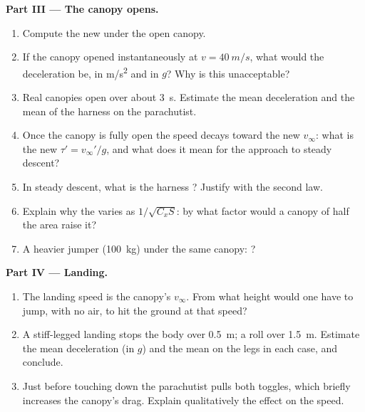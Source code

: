 \begin{problem}
\medskip
\noindent\textbf{Part III --- The canopy opens.}
\begin{enumerate}[resume]
  \item Compute the new  under the open canopy.
  \item If the canopy opened instantaneously at $v = \qty{40}{m/s}$, what
        would the deceleration be, in \unit{m/s^2} and in $g$? Why is
        this unacceptable?
  \item Real canopies open over about \qty{3}{s}. Estimate the mean
        deceleration and the mean  of the harness on the
        parachutist.
  \item Once the canopy is fully open the speed decays toward the new
        $v_\infty$: what is the new  $\tau' = v_\infty'/g$,
        and what does it mean for the approach to steady descent?
  \item In steady descent, what is the harness ? Justify with the
        second law.
  \item Explain why the  varies as $1/\sqrt{C_xS}$: by
        what factor would a canopy of half the area raise it?
  \item A heavier jumper (\qty{100}{kg}) under the same canopy: ?
\end{enumerate}

\medskip
\noindent\textbf{Part IV --- Landing.}
\begin{enumerate}[resume]
  \item The landing speed is the canopy's $v_\infty$. From what height
        would one have to jump, with no air, to hit the ground at that
        speed?
  \item A stiff-legged landing stops the body over \qty{0.5}{m}; a roll
        over \qty{1.5}{m}. Estimate the mean deceleration (in $g$) and
        the mean  on the legs in each case, and conclude.
  \item Just before touching down the parachutist pulls both toggles,
        which briefly increases the canopy's drag. Explain qualitatively
        the effect on the speed.
\end{enumerate}


\end{problem}
